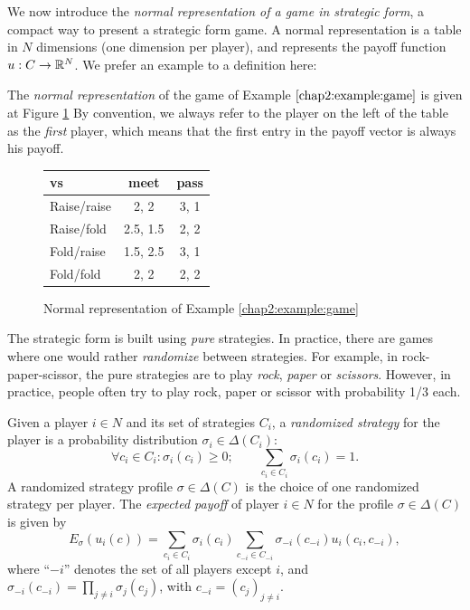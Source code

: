 We now introduce the
 \emph{normal representation of a game in strategic form},
a compact way to present a strategic form game.
A normal representation is a table in $N$ dimensions
 (one dimension per player),
 and represents the payoff function
 $u : C \rightarrow \mathbb{R}^N$.
 We prefer an example to a definition here:
\begin{example}
The \emph{normal representation} of the game of Example $\ref{chap2:example:game}$ is given at Figure \ref{chap2:table}
By convention, we always refer to the player on the left of the table as the \emph{first} player,
which means that the first entry in the payoff vector is always his payoff.
\begin{figure}[!ht]
\centering
\begin{tabular}{l|cc}
\TAtwo{} vs \TAone{} & meet & pass \\
\hline
Raise/raise & 2, 2 & 3, 1 \\
Raise/fold & 2.5, 1.5 & 2, 2 \\
Fold/raise & 1.5, 2.5 & 3, 1 \\
Fold/fold & 2, 2 & 2, 2
\end{tabular}
\caption{Normal representation of Example \ref{chap2:example:game}}
\label{chap2:table}
\end{figure}

\end{example}

The strategic form is built using \emph{pure} strategies. In practice, there are games where one would rather \emph{randomize} between strategies.
For example,  in rock-paper-scissor, the pure strategies are to play \emph{rock},  \emph{paper} or \emph{scissors}. However, in practice, people often try to play rock, paper or scissor with probability 1/3 each.

\begin{definition}
Given a player $i \in N$ and its set of strategies $C_i$, a \emph{randomized strategy} for the player is a probability distribution $\sigma_i \in \Delta(C_i)$:
$$ \forall c_i \in C_i: \sigma_i(c_i) \geq 0; \qquad \sum_{c_i \in C_i} \sigma_i(c_i) = 1.$$
A randomized strategy profile $\sigma \in \Delta(C)$ is the choice of one randomized strategy per player.
The \emph{expected payoff} of player $i \in N$ for the profile $\sigma \in \Delta(C)$ is given by
$$E_\sigma(u_i(c)) = \sum_{c_i \in C_i} \sigma_i(c_i) \sum_{c_{-i} \in C_{-i}} \sigma_{-i}(c_{-i}) u_i(c_i, c_{-i}), $$
where ``$-i$'' denotes the set of all players except $i$, and
$\sigma_{-i}(c_{-i}) = \prod_{j \neq i}\sigma_{j}(c_j)$, with $c_{-i} = (c_j)_{j \neq i}$.
\end{definition}


